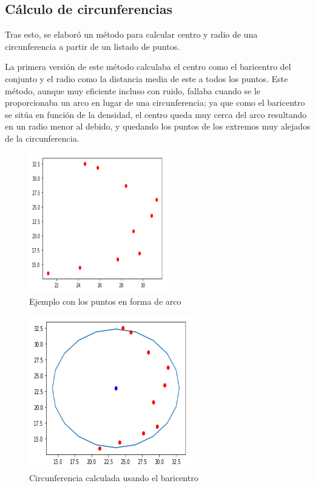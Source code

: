\documentclass[conference,a4paper]{IEEEtran}
\begin{document}
\subsection{Cálculo de circunferencias}

Tras esto, se elaboró un método para calcular centro y radio de una circunferencia a partir de un listado de puntos.

La primera versión de este método calculaba el centro como el baricentro del conjunto y el radio como la distancia media de este a todos los puntos. Este método, aunque muy eficiente incluso con ruido, fallaba cuando se le proporcionaba un arco en lugar de una circunferencia; ya que como el baricentro se sitúa en función de la densidad, el centro queda muy cerca del arco resultando en un radio menor al debido, y quedando los puntos de los extremos muy alejados de la circunferencia.

\begin{figure}[H]
\centering
\includegraphics[scale=0.9]{ArcoBaricentro}
\caption{Ejemplo con los puntos en forma de arco}
\end{figure}

\begin{figure}[H]
\centering
\includegraphics[scale=0.8]{ArcoBaricentroResultado}
\caption{Circunferencia calculada usando el baricentro}
\end{figure}
\end{document}
